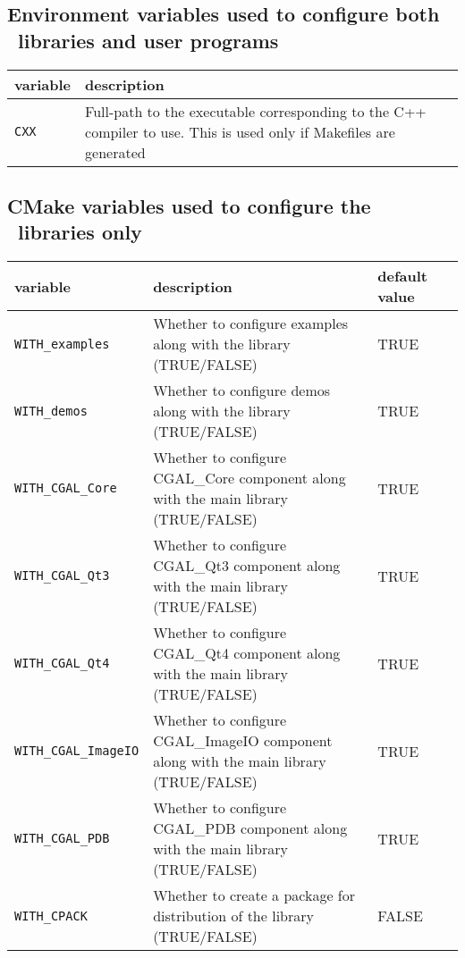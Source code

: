 \subsection{Environment variables used to configure both \cgal\ libraries and user programs}

\begin{center}
  \renewcommand{\arraystretch}{1.3}
  \gdef\lcTabularBorder{2}
  \begin{tabular}{|l|l|} \hline
    \textbf{variable}  & \textbf{description} 
    \\\hline\hline
    {\tt CXX } & Full-path to the executable corresponding to the C++ compiler to use. This is used only if Makefiles are generated
    \\\hline
  \end{tabular}
\end{center}

\subsection{CMake variables used to configure the \cgal\ libraries only}

\begin{center}
  \renewcommand{\arraystretch}{1.3}
  \gdef\lcTabularBorder{2}
  \begin{tabular}{|l|l|l|l|} \hline
    \textbf{variable} & \textbf{description} & \textbf{default value}
    \\\hline\hline
    {\tt WITH\_examples}  & Whether to configure examples along with the library (TRUE/FALSE) & TRUE
    \\\hline
    {\tt WITH\_demos} & Whether to configure demos along with the library (TRUE/FALSE) & TRUE
    \\\hline
    {\tt WITH\_CGAL\_Core} & Whether to configure CGAL\_Core component along with the main library (TRUE/FALSE) & TRUE
    \\\hline
    {\tt WITH\_CGAL\_Qt3} & Whether to configure CGAL\_Qt3 component along with the main library (TRUE/FALSE) & TRUE
    \\\hline
    {\tt WITH\_CGAL\_Qt4} & Whether to configure CGAL\_Qt4 component along with the main library (TRUE/FALSE) & TRUE
    \\\hline
    {\tt WITH\_CGAL\_ImageIO} & Whether to configure CGAL\_ImageIO component along with the main library (TRUE/FALSE) & TRUE
    \\\hline
    {\tt WITH\_CGAL\_PDB} & Whether to configure CGAL\_PDB component along with the main library (TRUE/FALSE) & TRUE
    \\\hline
    {\tt WITH\_CPACK} & Whether to create a package for distribution of the library (TRUE/FALSE) & FALSE
    \\\hline
  \end{tabular}
\end{center}


